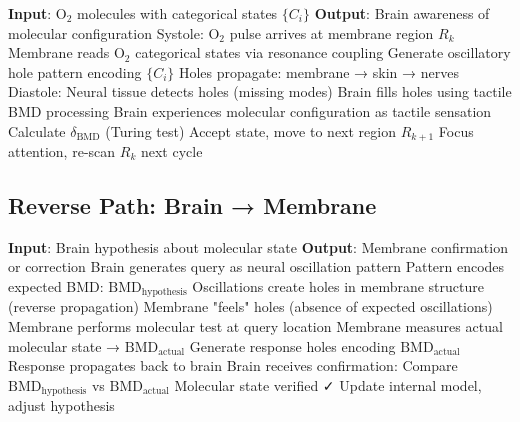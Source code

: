 \documentclass[11pt,a4paper]{article}
\theoremstyle{definition}
\theoremstyle{remark}
\begin{document}
\begin{algorithm}[H]
\caption{Forward Information Transfer}
\begin{algorithmic}[1]
\STATE \textbf{Input}: O$_2$ molecules with categorical states $\{C_i\}$
\STATE \textbf{Output}: Brain awareness of molecular configuration
    \STATE Systole: O$_2$ pulse arrives at membrane region $R_k$
    \STATE Membrane reads O$_2$ categorical states via resonance coupling
    \STATE Generate oscillatory hole pattern encoding $\{C_i\}$
    \STATE Holes propagate: membrane → skin → nerves
    \STATE Diastole: Neural tissue detects holes (missing modes)
    \STATE Brain fills holes using tactile BMD processing
    \STATE Brain experiences molecular configuration as tactile sensation
    \STATE Calculate $\delta_{\text{BMD}}$ (Turing test)
        \STATE Accept state, move to next region $R_{k+1}$
    \ELSE
        \STATE Focus attention, re-scan $R_k$ next cycle
    \ENDIF
\ENDFOR
\end{algorithmic}
\end{algorithm}

\subsection{Reverse Path: Brain → Membrane}

\begin{algorithm}[H]
\caption{Reverse Molecular Query}
\begin{algorithmic}[1]
\STATE \textbf{Input}: Brain hypothesis about molecular state
\STATE \textbf{Output}: Membrane confirmation or correction
\STATE Brain generates query as neural oscillation pattern
\STATE Pattern encodes expected BMD: $\text{BMD}_{\text{hypothesis}}$
\STATE Oscillations create holes in membrane structure (reverse propagation)
\STATE Membrane "feels" holes (absence of expected oscillations)
\STATE Membrane performs molecular test at query location
\STATE Membrane measures actual molecular state → $\text{BMD}_{\text{actual}}$
\STATE Generate response holes encoding $\text{BMD}_{\text{actual}}$
\STATE Response propagates back to brain
\STATE Brain receives confirmation: Compare $\text{BMD}_{\text{hypothesis}}$ vs $\text{BMD}_{\text{actual}}$
    \STATE Molecular state verified ✓
\ELSE
    \STATE Update internal model, adjust hypothesis
\ENDIF
\end{algorithmic}
\end{algorithm}
\end{document}
